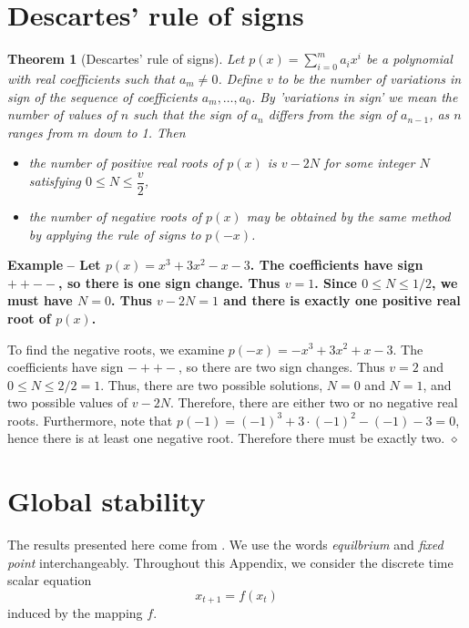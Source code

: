 \documentclass[12pt]{article}
\theoremstyle{plain}
\newtheorem{theorem}{Theorem}[section]
\newenvironment{example}{\vskip0.2cm\par\noindent\begin{small}\bf Example\,\,\rm --}{\hfill{$\diamond$}\end{small}\par\vskip0.25cm}
\begin{document}



\appendix
\section{Descartes' rule of signs}
\label{sec:descartes}
\begin{theorem}[Descartes' rule of signs]\label{th:descartes}
Let $p(x) = \sum_{i=0}^m a_ix^i $ be a polynomial with real coefficients such that $a_m \neq 0$.
Define $v$ to be the number of {\it variations in sign} of the sequence of coefficients $a_m, \ldots, a_0$. By 'variations in sign' we mean the number of values of $n$ such that the sign of $a_n$ differs from the sign of $a_{n - 1}$, as $n$ ranges from $m$ down to 1.
Then 
\begin{itemize}
\item the number of positive real roots of $p(x)$ is $v-2N$ for some integer $N$ satisfying $0 \leq N \leq \dfrac{v}{2}$,
\item the number of negative roots of $p(x)$ may be obtained by the same method by applying the rule of signs to $p(-x)$.
\end{itemize}
\end{theorem}


\begin{example}
Let $p(x) = x^3+3x^2-x-3$. The coefficients have sign $++--$, so there is one sign change.
Thus $v = 1$. Since $0 \leq N \leq 1/2$, we must have $N=0$. Thus $v-2N=1$ and there is exactly one positive real root of $p(x)$.

To find the negative roots, we examine $p(-x) = -x^3+3x^2+x-3$. The coefficients have sign $-++-$, so there are two sign changes. Thus $v=2$ and $0 \leq N \leq 2/2= 1$.
Thus, there are two possible solutions, $N=0$ and $N=1$, and two possible values of $v-2N$. Therefore, there are either two or no negative real roots.
Furthermore, note that $p(-1)=(-1)^3+3 \cdot (-1)^2-(-1)-3=0$, hence there is at least one negative root. Therefore there must be exactly two.
\end{example}

\section{Global stability}
\label{sec:global_stability}
The results presented here come from \cite{Allen2007}. We use the words \emph{equilbrium} and \emph{fixed point} interchangeably. Throughout this Appendix, we consider the discrete time scalar equation
\begin{equation}\label{sys}
x_{t+1}=f(x_t)
\end{equation}
induced by the mapping $f$.
\end{document}
